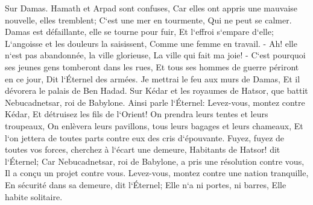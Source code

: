 \verse Sur Damas. Hamath et Arpad sont confuses, Car elles ont appris une mauvaise nouvelle, elles tremblent; C`est une mer en tourmente, Qui ne peut se calmer. 
\verse Damas est défaillante, elle se tourne pour fuir, Et l`effroi s`empare d`elle; L`angoisse et les douleurs la saisissent, Comme une femme en travail. - 
\verse Ah! elle n`est pas abandonnée, la ville glorieuse, La ville qui fait ma joie! - 
\verse C`est pourquoi ses jeunes gens tomberont dans les rues, Et tous ses hommes de guerre périront en ce jour, Dit l`Éternel des armées. 
\verse Je mettrai le feu aux murs de Damas, Et il dévorera le palais de Ben Hadad. 
\verse Sur Kédar et les royaumes de Hatsor, que battit Nebucadnetsar, roi de Babylone. Ainsi parle l`Éternel: Levez-vous, montez contre Kédar, Et détruisez les fils de l`Orient! 
\verse On prendra leurs tentes et leurs troupeaux, On enlèvera leurs pavillons, tous leurs bagages et leurs chameaux, Et l`on jettera de toutes parts contre eux des cris d`épouvante. 
\verse Fuyez, fuyez de toutes vos forces, cherchez à l`écart une demeure, Habitants de Hatsor! dit l`Éternel; Car Nebucadnetsar, roi de Babylone, a pris une résolution contre vous, Il a conçu un projet contre vous. 
\verse Levez-vous, montez contre une nation tranquille, En sécurité dans sa demeure, dit l`Éternel; Elle n`a ni portes, ni barres, Elle habite solitaire. 
